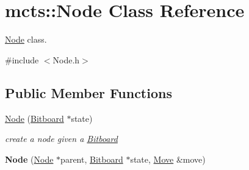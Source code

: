 \hypertarget{classmcts_1_1_node}{\section{mcts\+:\+:Node Class Reference}
\label{classmcts_1_1_node}
}


\hyperlink{classmcts_1_1_node}{Node} class.  




{\ttfamily \#include $<$Node.\+h$>$}

\subsection*{Public Member Functions}
\begin{DoxyCompactItemize}
\item 
\hyperlink{classmcts_1_1_node_a101662cf4ceb1b677d2f718ca5f0c727}{Node} (\hyperlink{class_bitboard}{Bitboard} $\ast$state)
\begin{DoxyCompactList}\small\item\em create a node given a \hyperlink{class_bitboard}{Bitboard} \end{DoxyCompactList}\item 
\hypertarget{classmcts_1_1_node_adad33ddba1395da46d0b90aef8f60e5b}{{\bfseries Node} (\hyperlink{classmcts_1_1_node}{Node} $\ast$parent, \hyperlink{class_bitboard}{Bitboard} $\ast$state, \hyperlink{class_move}{Move} \&move)}\label{classmcts_1_1_node_adad33ddba1395da46d0b90aef8f60e5b}


\end{DoxyCompactItemize}
